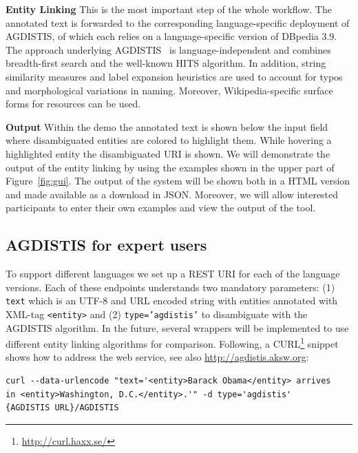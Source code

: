 \noindent\textbf{Entity Linking} 
This is the most important step of the whole workflow.
The annotated text is forwarded to the corresponding language-specific deployment of AGDISTIS, of which each relies on a language-specific version of DBpedia 3.9. 
The approach underlying AGDISTIS~\cite{agdistis_iswc} is language-independent and combines breadth-first search and the well-known  \ac{HITS} algorithm. 
In addition, string similarity measures and label expansion heuristics are used to account for typos and morphological variations in naming.
Moreover, Wikipedia-specific surface forms for resources can be used. 

\noindent\textbf{Output}
Within the demo the annotated text is shown below the input field where disambiguated entities are colored to highlight them. 
While hovering a highlighted entity the disambiguated URI is shown.
We will demonstrate the output of the entity linking by using the examples shown in the upper part of Figure~\ref{fig:gui}. 
The output of the system will be shown both in a HTML version and made available as a download in JSON. 
Moreover, we will allow interested participants to enter their own examples and view the output of the tool.

\subsection{AGDISTIS for expert users}

To support different languages we set up a REST URI for each of the language versions.
Each of these endpoints understands two mandatory parameters: (1) \texttt{text} which is an UTF-8 and URL encoded string with entities annotated with XML-tag \texttt{<entity>} and (2) \texttt{type='agdistis'} to disambiguate with the AGDISTIS algorithm.
In the future, several wrappers will be implemented to use different entity linking algorithms for comparison.
Following, a CURL\footnote{\url{http://curl.haxx.se/}} snippet shows how to address the web service, see also \url{http://agdistis.aksw.org}:
\begin{verbatim}
curl --data-urlencode "text='<entity>Barack Obama</entity> arrives 
in <entity>Washington, D.C.</entity>.'" -d type='agdistis' 
{AGDISTIS URL}/AGDISTIS
\end{verbatim}


